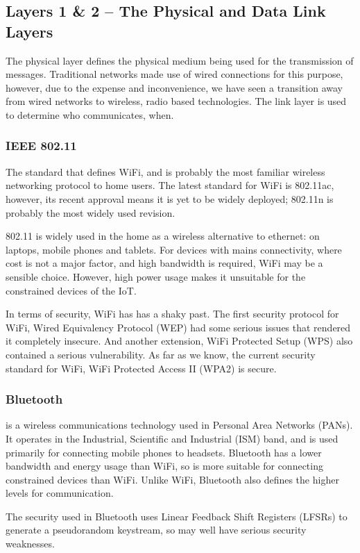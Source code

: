 \documentclass[11pt,journal,compsoc]{IEEEtran}
\begin{document}
\subsection{Layers 1 \& 2 -- The Physical and Data Link Layers}
The physical layer defines the physical medium being used for the transmission
of messages. Traditional networks made use of wired connections for this
purpose, however, due to the expense and inconvenience, we have seen a
transition away from wired networks to wireless, radio based technologies. The
link layer is used to determine who communicates, when.

\subsubsection{IEEE 802.11}
The standard that defines WiFi, and is probably the most
familiar wireless networking protocol to home users. The latest standard for
WiFi is 802.11ac, however, its recent approval means it is yet to be widely
deployed; 802.11n is probably the most widely used revision. 

802.11 is widely used in the home as a wireless alternative to ethernet: on
laptops, mobile phones and tablets. For devices with mains connectivity, where
cost is not a major factor, and high bandwidth is required, WiFi may be a
sensible choice.  However, high power usage makes it unsuitable for the
constrained devices of the IoT. 

In terms of security, WiFi has has a shaky past. The first security protocol
for WiFi, Wired Equivalency Protocol (WEP) had some serious issues that
rendered it completely insecure. And another extension, WiFi Protected
Setup (WPS) also contained a serious vulnerability. As far as we know, the
current security standard for WiFi, WiFi Protected Access II (WPA2) is
secure. 

\subsubsection{Bluetooth}
is a wireless communications technology used in Personal Area Networks (PANs).
It operates in the Industrial, Scientific and Industrial (ISM) band, and is
used primarily for connecting mobile phones to headsets. Bluetooth has a lower
bandwidth and energy usage than WiFi, so is more suitable for connecting
constrained devices than WiFi. Unlike WiFi, Bluetooth also defines the higher
levels for communication. 

The security used in Bluetooth uses Linear Feedback Shift Registers (LFSRs) to
generate a pseudorandom keystream, so may well have serious security
weaknesses.
\end{document}
